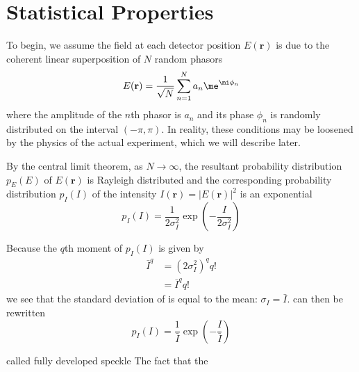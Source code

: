 \section{Statistical Properties}
To begin, we assume the field at each detector position $E(\mathbf{r})$ is
due to the coherent linear superposition of $N$ random phasors
\begin{equation}
E(\mathbf{r}) = \frac{1}{\sqrt{N}} \sum_{n=1}^{N} a_n \me^{\mi \phi_n}
\end{equation}
where the amplitude of the $n$th phasor is $a_n$ and its phase $\phi_n$ is
randomly distributed on the interval $(-\pi,\pi)$.  In reality, these
conditions may be loosened by the physics of the actual experiment, which
we will describe later.

By the central limit theorem, as $N\to\infty$, the resultant probability
distribution $p_E(E)$ of $E(\mathbf{r})$ is Rayleigh distributed and the
corresponding probability distribution $p_I(I)$ of the intensity
$I(\mathbf{r})=|E(\mathbf{r})|^2$ is an exponential
\begin{equation}
p_I(I) = \frac{1}{2\sigma_I^2}\exp\left(-\frac{I}{2\sigma_I^2}\right)
\label{eqn:propexp}
\end{equation}

Because the $q$th moment of $p_I(I)$ is given by 
\begin{align}
\bar{I}^q&=(2\sigma_I^2)^q q!\\
         &=\bar{I}^q q!
\end{align}
we see that the standard deviation of is equal to the mean: 
$\sigma_I=\bar{I}$.   can then be rewritten
\begin{equation}
p_I(I) = \frac{1}{\bar{I}}\exp\left(-\frac{I}{\bar{I}}\right)
\end{equation}

called fully developed speckle
The fact that the 

